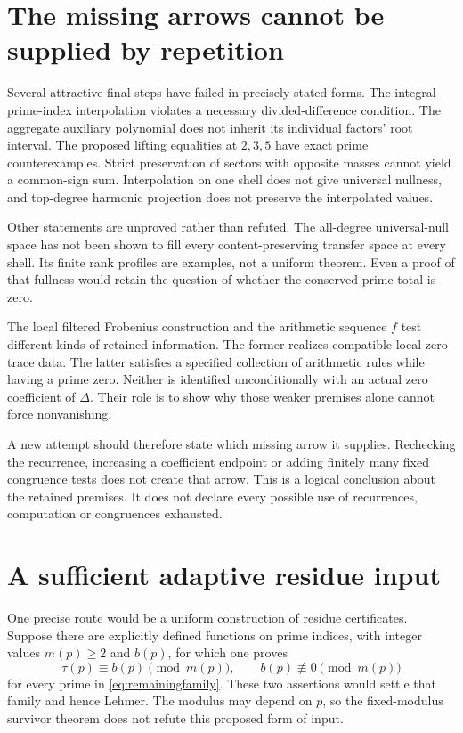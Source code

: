 \section{The missing arrows cannot be supplied by repetition}
Several attractive final steps have failed in precisely stated forms. The integral prime-index interpolation violates a necessary divided-difference condition. The aggregate auxiliary polynomial does not inherit its individual factors' root interval. The proposed lifting equalities at $2,3,5$ have exact prime counterexamples. Strict preservation of sectors with opposite masses cannot yield a common-sign sum. Interpolation on one shell does not give universal nullness, and top-degree harmonic projection does not preserve the interpolated values.

Other statements are unproved rather than refuted. The all-degree universal-null space has not been shown to fill every content-preserving transfer space at every shell. Its finite rank profiles are examples, not a uniform theorem. Even a proof of that fullness would retain the question of whether the conserved prime total is zero.

The local filtered Frobenius construction and the arithmetic sequence $f$ test different kinds of retained information. The former realizes compatible local zero-trace data. The latter satisfies a specified collection of arithmetic rules while having a prime zero. Neither is identified unconditionally with an actual zero coefficient of $\Delta$. Their role is to show why those weaker premises alone cannot force nonvanishing.

A new attempt should therefore state which missing arrow it supplies. Rechecking the recurrence, increasing a coefficient endpoint or adding finitely many fixed congruence tests does not create that arrow. This is a logical conclusion about the retained premises. It does not declare every possible use of recurrences, computation or congruences exhausted.

\section{A sufficient adaptive residue input}
One precise route would be a uniform construction of residue certificates. Suppose there are explicitly defined functions on prime indices, with integer values $m(p)\ge2$ and $b(p)$, for which one proves
\begin{equation}\label{eq:adaptiveresidueinput}
\tau(p)\equiv b(p)\pmod{m(p)},
\qquad b(p)\not\equiv0\pmod{m(p)}
\end{equation}
for every prime in \eqref{eq:remainingfamily}. These two assertions would settle that family and hence Lehmer. The modulus may depend on $p$, so the fixed-modulus survivor theorem does not refute this proposed form of input.

